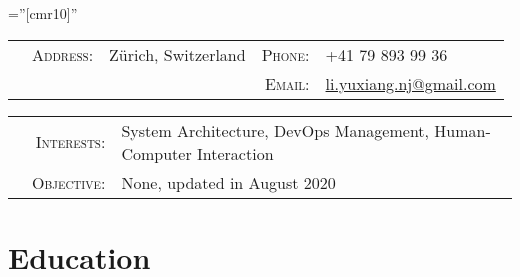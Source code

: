 \documentclass[a4paper,10pt]{article} %
\begin{document}
\pagestyle{empty} %

\font\fb=''[cmr10]'' %


\par{} %
\vspace{0.1cm}

\begin{tabular}{@{}p{0.67cm}rp{8.75cm}rl}
     & \textsc{Address:} & Zürich, Switzerland & \textsc{Phone:} & +41 79 893 99 36                                               \\
     &                   &                     & \textsc{Email:} & \href{mailto:li.yuxiang.nj@gmail.com}{li.yuxiang.nj@gmail.com}
\end{tabular}

\begin{tabular}{p{0.215cm}rl}
     & \textsc{Interests:} & System Architecture, DevOps Management, Human-Computer Interaction \\
     & \textsc{Objective:} & None, updated in August 2020
\end{tabular}


\section{Education}
\end{document}
